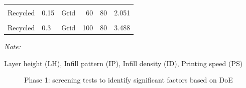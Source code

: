\documentclass[conference,final,]{IEEEtran}
\begin{document}
\begin{table}
\begin{threeparttable}
\begin{tabular}[t]{lllrrr}
\cellcolor{gray!6}{Recycled} & \cellcolor{gray!6}{0.3} & \cellcolor{gray!6}{Tri-hex} & \cellcolor{gray!6}{100} & \cellcolor{gray!6}{40} & \cellcolor{gray!6}{3.370}\\
Recycled & 0.15 & Grid & 60 & 80 & 2.051\\
\cellcolor{gray!6}{Recycled} & \cellcolor{gray!6}{0.15} & \cellcolor{gray!6}{Grid} & \cellcolor{gray!6}{100} & \cellcolor{gray!6}{40} & \cellcolor{gray!6}{3.525}\\
Recycled & 0.3 & Grid & 100 & 80 & 3.488\\
\bottomrule
\end{tabular}
\begin{tablenotes}
\item \textit{Note: } 
\item Layer height (LH), Infill pattern (IP), Infill density (ID), Printing speed (PS)
\end{tablenotes}
\end{threeparttable}
\end{table}

\begin{figure}[!t]
\centering
{}
\hfil
{}
\caption{Phase 1: screening tests to identify significant factors based on DoE}
\label{Fig:Phase.1b}
\end{figure}
\end{document}
